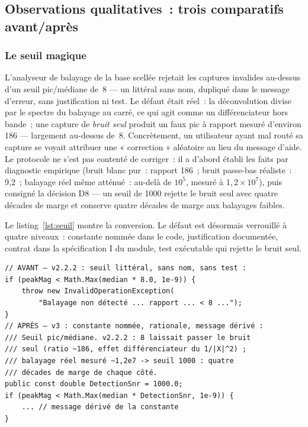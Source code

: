 \subsection{Observations qualitatives~: trois comparatifs
avant/après}\label{sec:comparatifs}

\subsubsection{Le seuil magique}\label{sec:seuil}

L’analyseur de balayage de la base scellée rejetait les captures invalides
au-dessus d’un seuil pic/médiane de~8 — un littéral sans nom, dupliqué dans
le message d’erreur, sans justification ni test. Le défaut était réel~: la
déconvolution divise par le spectre du balayage au carré, ce qui agit
comme un différenciateur hors bande~; une capture de \emph{bruit seul}
produit un faux pic à rapport mesuré d’environ 186 — largement au-dessus
de~8. Concrètement, un utilisateur ayant mal routé sa capture se voyait
attribuer une « correction » aléatoire au lieu du message d’aide. Le
protocole ne s’est pas contenté de corriger~: il a d’abord établi les faits
par diagnostic empirique (bruit blanc pur~: rapport 186~; bruit passe-bas
réaliste~: 9,2~; balayage réel même atténué~: au-delà de $10^{5}$, mesuré à
$1{,}2 \times 10^{7}$), puis consigné la décision D8 — un seuil de 1000
rejette le bruit seul avec quatre décades de marge et conserve quatre
décades de marge aux balayages faibles.

Le listing~\ref{lst:seuil} montre la conversion. Le défaut est désormais
verrouillé à quatre niveaux~: constante nommée dans le code, justification
documentée, contrat dans la spécification I du module, test exécutable qui
rejette le bruit seul.

\begin{lstlisting}[float=t, caption={Le seuil de détection, avant (haut) et
après (bas). Extraits abrégés des deux dépôts.}, label={lst:seuil}]
// AVANT — v2.2.2 : seuil littéral, sans nom, sans test :
if (peakMag < Math.Max(median * 8.0, 1e-9)) {
    throw new InvalidOperationException(
        "Balayage non détecté ... rapport ... < 8 ...");
}
// APRÈS — v3 : constante nommée, rationale, message dérivé :
/// Seuil pic/médiane. v2.2.2 : 8 laissait passer le bruit
/// seul (ratio ~186, effet différenciateur du 1/|X|^2) ;
/// balayage réel mesuré ~1,2e7 -> seuil 1000 : quatre
/// décades de marge de chaque côté.
public const double DetectionSnr = 1000.0;
if (peakMag < Math.Max(median * DetectionSnr, 1e-9)) {
    ... // message dérivé de la constante
}
\end{lstlisting}

